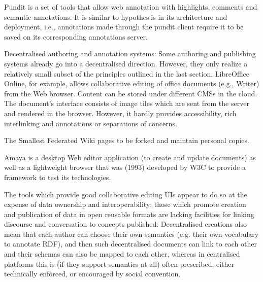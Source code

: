 \documentclass[a4paper]{llncs}
\begin{document}
                                \empty Pundit is a set of tools that allow web annotation with highlights, comments and semantic annotations. It is similar to hypothes.is in its architecture and deployment, i.e., annotations made through the pundit client require it to be saved on its corresponding annotations server.




                            

                            
\par 
                                Decentralised authoring and annotation systems:
                                Some authoring and publishing systems already go into a decentralised direction. However, they only realize a relatively small subset of the principles outlined in the last section. \empty LibreOffice Online, for example, allows collaborative editing of office documents (e.g., Writer) from the Web browser. Content can be stored under different CMSs in the cloud. The document’s interface consists of image tiles which are sent from the server and rendered in the browser. However, it hardly provides accessibility, rich interlinking and annotations or separations of concerns.

                                The \empty Smallest Federated Wiki pages to be forked and maintain personal copies.

                                

                                \empty Amaya is a desktop Web editor application (to create and update documents) as well as a lightweight browser that was (1993) developed by W3C to provide a framework to test its technologies.
                            

                            
\par The tools which provide good collaborative editing UIs appear to do so at the expense of data ownership and interoperability; those which promote creation and publication of data in open reusable formats are lacking facilities for linking discourse and conversation to concepts published. Decentralised creations also mean that each author can choose their own semantics (e.g. their own vocabulary to annotate RDF), and then such decentralised documents can link to each other and their schemas can also be mapped to each other, whereas in centralised platforms this is (if they support semantics at all) often prescribed, either technically enforced, or encouraged by social convention.
                        
\end{document}
